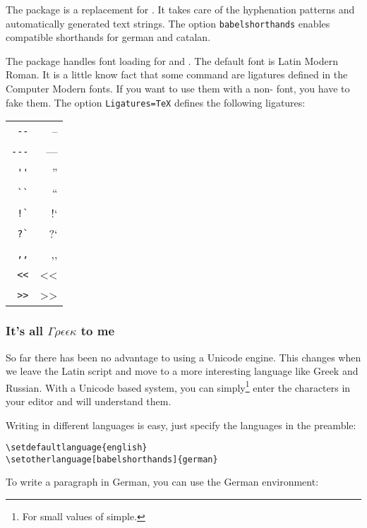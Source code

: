 The package \cite{polyglossia} is a replacement for
. It takes care of the hyphenation patterns and automatically
generated text strings. The option \verb|babelshorthands| enables
 compatible shorthands for german and catalan.

The package \cite{fontspec} handles font loading for
 and . The default font is Latin Modern
Roman. It is a little know fact that some  command are ligatures
defined in the Computer Modern fonts. If you want to use them with a
non- font, you have to fake them. The option
\texttt{Ligatures=TeX} defines the following ligatures:

\begin{tabular}{rr}
\verb|--|	& --\\
\verb|---|	& ---\\
\verb|''|	& ''\\
\verb|``|	& ``\\
\verb|!`|	& !`\\
\verb|?`|	& ?`\\
\verb|,,|	& ,,\\
\verb|<<|	& <<\\
\verb|>>|	& >>\\
\end{tabular}

\subsubsection{It's all $\Gamma\rho\epsilon\epsilon\kappa$ to me}

So far there has been no advantage to using a Unicode  engine.
This changes when we leave the Latin script and move to a more interesting
language like Greek and Russian.  With a Unicode based system, you can
simply\footnote{For small values of simple.} enter the characters in your
editor and  will understand them.

Writing in different languages is easy, just specify the languages in the preamble:

\begin{lscommand}
\verb|\setdefaultlanguage{english}|\\
\verb|\setotherlanguage[babelshorthands]{german}|
\end{lscommand}
%
To write a paragraph in German, you can use the German environment:

